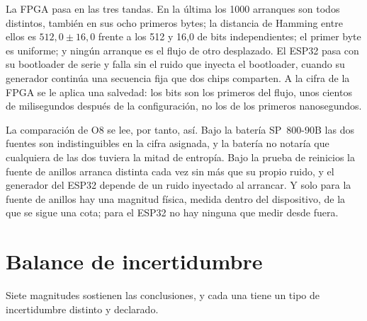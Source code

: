 La \ac{FPGA} pasa en las tres tandas. En la última los 1000 arranques
son todos distintos, también en sus ocho primeros bytes; la distancia de
Hamming entre ellos es $512{,}0 \pm 16{,}0$ frente a los 512 y 16,0 de
bits independientes; el primer byte es uniforme; y ningún arranque es el
flujo de otro desplazado. El ESP32 pasa con su bootloader de serie y
falla sin el ruido que inyecta el bootloader, cuando su generador
continúa una secuencia fija que dos chips comparten. A la cifra de la
\ac{FPGA} se le aplica una salvedad: los bits son los primeros del flujo,
unos cientos de milisegundos después de la configuración, no los de los
primeros nanosegundos.

La comparación de O8 se lee, por tanto, así. Bajo la batería SP~800-90B
las dos fuentes son indistinguibles en la cifra asignada, y la batería no
notaría que cualquiera de las dos tuviera la mitad de entropía. Bajo la
prueba de reinicios la fuente de anillos arranca distinta cada vez sin
más que su propio ruido, y el generador del ESP32 depende de un ruido
inyectado al arrancar. Y solo para la fuente de anillos hay una magnitud
física, medida dentro del dispositivo, de la que se sigue una cota; para
el ESP32 no hay ninguna que medir desde fuera.

\section{Balance de incertidumbre}
\label{sec:uncertainty}

Siete magnitudes sostienen las conclusiones, y cada una tiene un tipo de
incertidumbre distinto y declarado.

